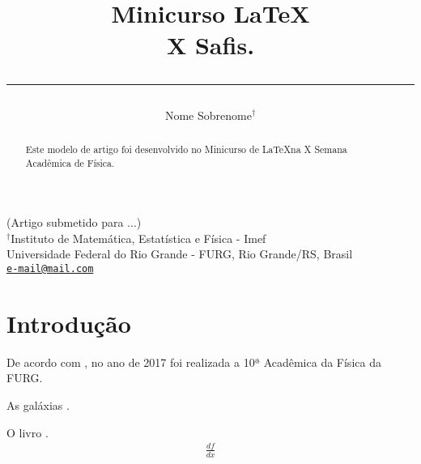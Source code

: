 \documentclass[12pt,a4paper]{article}
\newcommand{\lH}[1]{\rule{\linewidth}{#1}}
\newcommand{\D}[2]{\frac{d #1}{d #2}}
\begin{document}
\title{{\fontsize	{16pt}{10.0}\selectfont  Minicurso \LaTeX}\\
	{\fontsize{12pt}{10.0}\selectfont  X Safis.} \\
	\lH{0.07cm}}
\author{\sc Nome Sobrenome$^{\dagger}$}
\date{}	
\maketitle

\begin{center}
	 {(Artigo submetido para ...)} \\[2mm]
		${^\dagger}$Instituto de Matemática, Estatística e Física - Imef \\
			Universidade Federal do Rio Grande - FURG, Rio Grande/RS, Brasil \\
	\texttt{\url{e-mail@mail.com}}
\end{center}
\begin{abstract}
	Este modelo de artigo foi desenvolvido no Minicurso de \LaTeX na X Semana Acadêmica de Física.
\end{abstract}
\section{\sc Introdução}

De acordo com \cite{saf}, no ano de 2017 foi realizada a 10ª Acadêmica da Física da FURG.

As galáxias \citet{1998ken}.

O livro \cite{b1}.
\begin{align}
\D{f}{x}
\end{align}
%
%
%
\end{document}
